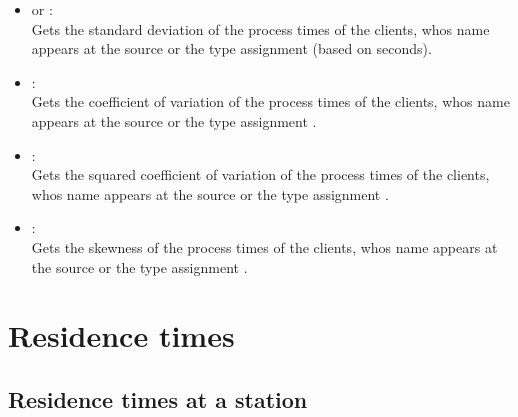 \begin{itemize}
\item
{} or :\\
Gets the standard deviation of the process times of the clients, whos name appears at the source or the type assignment  (based on seconds).

\item
{}:\\
Gets the coefficient of variation of the process times of the clients, whos name appears at the source or the type assignment .

\item
{}:\\
Gets the squared coefficient of variation of the process times of the clients, whos name appears at the source or the type assignment .

\item
{}:\\
Gets the skewness of the process times of the clients, whos name appears at the source or the type assignment .

\end{itemize}



\section{Residence times}



\subsection{Residence times at a station}

